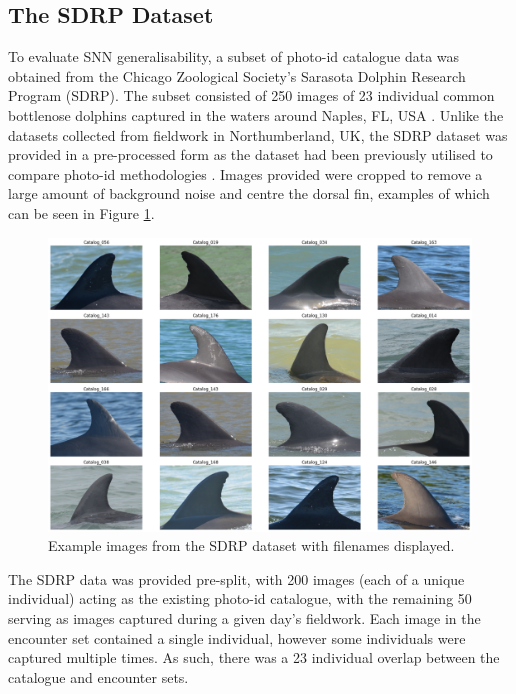 \subsection{The SDRP Dataset}\label{ch:SNNEvaluation,sec:SDRP,sub:SDRPDataset}

To evaluate SNN generalisability, a subset of photo-id catalogue data was obtained from the Chicago Zoological Society's Sarasota Dolphin Research Program (SDRP). The subset consisted of 250 images of 23 individual common bottlenose dolphins captured in the waters around Naples, FL, USA \cite{tyson_moore_final_2020}. Unlike the datasets collected from fieldwork in Northumberland, UK, the SDRP dataset was provided in a pre-processed form as the dataset had been previously utilised to compare photo-id methodologies \cite{tyson_moore_rise_2022}. Images provided were cropped to remove a large amount of background noise and centre the dorsal fin, examples of which can be seen in Figure \ref{fig:sdrp-example}. 

\begin{figure}
	\begin{center}
		\includegraphics[scale=0.3]{Chapter6/figs/SDRP_egs_tiled.png}
	\end{center}
	\caption{Example images from the SDRP dataset with filenames displayed.}
	\label{fig:sdrp-example}
\end{figure}

The SDRP data was provided pre-split, with 200 images (each of a unique individual) acting as the existing photo-id catalogue, with the remaining 50 serving as images captured during a given day's fieldwork. Each image in the encounter set contained a single individual, however some individuals were captured multiple times. As such, there was a 23 individual overlap between the catalogue and encounter sets. 

